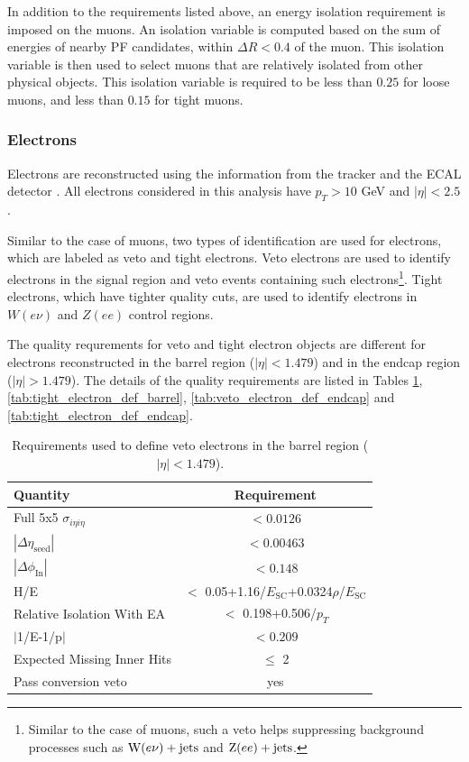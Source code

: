 In addition to the requirements listed above, an energy isolation requirement is imposed on the muons. An isolation variable 
is computed based on the sum of energies of nearby PF candidates, within $\Delta R < 0.4$ of the muon. This isolation
variable is then used to select muons that are relatively isolated from other physical objects. This isolation variable
is required to be less than $0.25$ for loose muons, and less than $0.15$ for tight muons.


\subsubsection{Electrons}
\label{subsec:electrons}

Electrons are reconstructed using the information from the tracker and the ECAL detector \cite{cms:elepho_paper}. All electrons
considered in this analysis have $p_T > 10$ GeV and $|\eta| < 2.5$.

Similar to the case of muons, two types of identification are used for electrons, which are labeled as veto and tight electrons.
Veto electrons are used to identify electrons in the signal region and veto events containing such 
electrons\footnote{Similar to the case of muons, such a veto helps suppressing background processes such as
$\mathrm{W}(e\nu)+\textrm{jets}$ and $\mathrm{Z}(ee)+\textrm{jets}$.}. 
Tight electrons, which have tighter
quality cuts, are used to identify electrons in $W(e \nu)$ and $Z(ee)$ control regions.

The quality requrements for veto and tight electron objects are different for electrons reconstructed in the barrel region
($|\eta| < 1.479$) and in the endcap region ($|\eta| > 1.479$). The details of the quality requirements are listed in Tables \ref{tab:veto_electron_def_barrel},
\ref{tab:tight_electron_def_barrel}, \ref{tab:veto_electron_def_endcap} and \ref{tab:tight_electron_def_endcap}.

\begin{table}[htbp]
\centering
\def\arraystretch{1.2}

\begin{tabular}{|l|c|}
    \hline\hline
    Quantity & Requirement \\\hline
    Full 5x5 $\sigma_{i\eta i\eta}$ &  $< 0.0126$ \\
    $|\Delta\eta_{\mathrm{seed}}|$ & $< 0.00463$  \\
    $|\Delta\phi_{\mathrm{In}}|$ & $< 0.148$ \\
    H/E & $<$ 0.05+1.16/$E_{\mathrm{SC}}$+0.0324$\rho$/$E_{\mathrm{SC}}$ \\
    Relative Isolation With EA & $<$ 0.198+0.506/$p_T$ \\
    $|$1/E-1/p$|$ & $< 0.209$ \\
    Expected Missing Inner Hits & $\leq$ 2 \\
    Pass conversion veto & yes \\
    \hline\hline
\end{tabular}
\caption{Requirements used to define veto electrons in the barrel region ($|\eta| < 1.479$).}
\label{tab:veto_electron_def_barrel}
\end{table}


